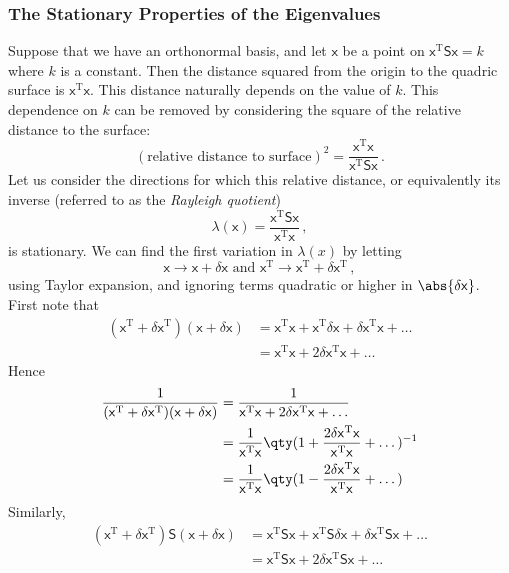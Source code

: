 \documentclass{article}
\theoremstyle{plain}\theoremheaderfont{\normalfont\itshape}\theorembodyfont{\rmfamily}\theoremseparator{.}\newtheorem*{rem}{Remark}\newtheorem*{ex}{Example}\newtheorem*{proof}{Proof}\newtheorem*{altp}{Alternative proof}
\theoremstyle{plain}\theoremheaderfont{\normalfont\bfseries}\theorembodyfont{\rmfamily}\theoremseparator{.}\newtheorem{thm}{Theorem}[section]\newtheorem{lem}[thm]{Lemma}\newtheorem{prop}[thm]{Proposition}\newtheorem*{cor}{Corollary}\newtheorem{defn}[thm]{Definition}\newtheorem{clm}[thm]{Claim}\newtheorem{clminproof}{Claim}
\theoremstyle{break}\theoremheaderfont{\normalfont\itshape}\theorembodyfont{\rmfamily}\theoremseparator{.\medskip}\newtheorem*{proofskip}{Proof}\newtheorem*{exs}{Examples}\newtheorem*{rems}{Remarks}
\theoremstyle{break}\theoremheaderfont{\normalfont\bfseries}\theorembodyfont{\rmfamily}\theoremseparator{.\medskip}\newtheorem{lemskip}[thm]{Lemma}\newtheorem{defnskip}[thm]{Definition}\newtheorem{propskip}[thm]{Proposition}\newtheorem{thmskip}[thm]{Theorem}
\numberwithin{equation}{section}
\newcommand{\tp}{^\mathrm{T}}
\begin{document}
	\subsubsection{The Stationary Properties of the Eigenvalues}
	Suppose that we have an orthonormal basis, and let \(\mathsf{x}\) be a point on \(\mathsf{x\tp Sx}=k\) where \(k\) is a constant. Then the distance squared from the origin to the quadric surface is \(\mathsf{x\tp x}\). This distance naturally depends on the value of \(k\). This dependence on \(k\) can be removed by considering the square of the relative distance to the surface:
	\[(\text{relative distance to surface})^2=\frac{\mathsf{x\tp x}}{\mathsf{x\tp Sx}}\,.\]
	Let us consider the directions for which this relative distance, or equivalently its inverse (referred to as the \textit{Rayleigh quotient})
	\[\lambda(\mathsf{x})=\frac{\mathsf{x\tp Sx}}{\mathsf{x\tp x}}\,,\]
	is stationary. We can find the first variation in \(\lambda(x)\) by letting
	\[\mathsf{x\to x}+\delta\mathsf{x}\text{ and }\mathsf{x\tp \to x\tp}+\delta\mathsf{x}\tp\,,\]
	using Taylor expansion, and ignoring terms quadratic or higher in \(\abs{\delta\mathsf{x}}\). First note that
	\begin{align*}
		(\mathsf{x\tp}+\delta\mathsf{x}\tp)(\mathsf{x}+\delta\mathsf{x})&=\mathsf{x\tp x}+\mathsf{x}\tp\delta\mathsf{x}+\delta\mathsf{x}\tp\mathsf{x}+\dots\\
		&=\mathsf{x\tp x}+2\delta\mathsf{x}\tp\mathsf{x}+\dots
	\end{align*}
	Hence
	\begin{align*}
		\frac{1}{(\mathsf{x\tp}+\delta\mathsf{x}\tp)(\mathsf{x}+\delta\mathsf{x})}&=\frac{1}{\mathsf{x\tp x}+2\delta\mathsf{x}\tp\mathsf{x}+\dots}\\
		&=\frac{1}{\mathsf{x\tp x}}\qty(1+\frac{2\delta\mathsf{x}\tp\mathsf{x}}{\mathsf{x\tp x}}+\dots)^{-1}\\
		&=\frac{1}{\mathsf{x\tp x}}\qty(1-\frac{2\delta\mathsf{x}\tp\mathsf{x}}{\mathsf{x\tp x}}+\dots)
	\end{align*}
	Similarly,
	\begin{align*}
		(\mathsf{x\tp}+\delta\mathsf{x}\tp)\mathsf{S}(\mathsf{x}+\delta\mathsf{x})&=\mathsf{x\tp Sx}+\mathsf{x}\tp\mathsf{S}\delta\mathsf{x}+\delta\mathsf{x}\tp\mathsf{Sx}+\dots\\
		&=\mathsf{x\tp Sx}+2\delta\mathsf{x}\tp\mathsf{Sx}+\dots
	\end{align*}
	
\end{document}

